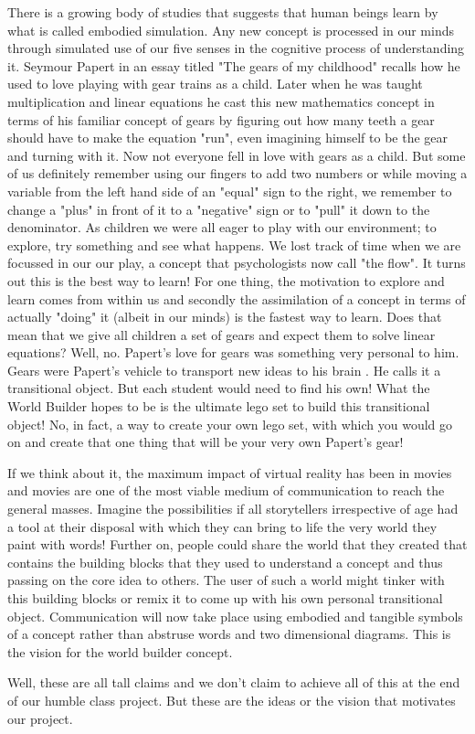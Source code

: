 There is a growing body of studies that suggests that human beings learn by what is called embodied simulation. Any new concept is processed in our minds
 through simulated use of our five senses in the cognitive process of understanding it. Seymour Papert in an essay titled "The gears of my childhood" 
 recalls how he used to love playing with gear trains as a child. Later when he was taught multiplication and linear equations he cast this new 
 mathematics concept in terms of his familiar concept of gears by figuring out how many teeth a gear should have to make the equation "run", even 
 imagining himself to be the gear and turning with it. Now not everyone fell in love with gears as a child. But some of us definitely remember using our 
 fingers to add two numbers or while moving a variable from the left hand side of an "equal" sign to the right, we remember to change a "plus" in front of
  it to a "negative" sign or to "pull" it down to the denominator. As children we were all eager to play with our environment; to explore, try something 
  and see what happens. We lost track of time when we are focussed in our our play, a concept that psychologists now call "the flow". It turns out this is
 the best way to learn! For one thing, the motivation to explore and learn comes from within us and secondly the assimilation of a concept in terms of 
 actually "doing" it (albeit in our minds) is the fastest way to learn. Does that mean that we give all children a set of gears and expect them to solve
 linear equations? Well, no. Papert's love for gears was something very personal to him. Gears were Papert's vehicle to transport new ideas to his brain
  . He calls it a transitional object. But each student would need to find his own! What the World Builder hopes to be is the ultimate lego set to build
  this transitional object! No, in fact, a way to create your own lego set, with which you would go on and create that one thing that will be your very
   own Papert's gear! 



If we think about it, the maximum impact of virtual reality has been in movies and movies are one of the most viable medium of communication to reach the
 general masses. Imagine the possibilities if all storytellers irrespective of age had a tool at their disposal with which they can bring to life the very
  world they paint with words! Further on, people could share the world that they created that contains the building blocks that they used to understand a
   concept and thus passing on the core idea to others. The user of such a world might tinker with this building blocks or remix it to come up with his 
   own personal transitional object. Communication will now take place using embodied and tangible symbols of a concept rather than abstruse words and two
    dimensional diagrams. This is the vision for the world builder concept.


Well, these are all tall claims and we don't claim to achieve all of this at the end of our humble class project. But these are the ideas or the vision
 that motivates our project.